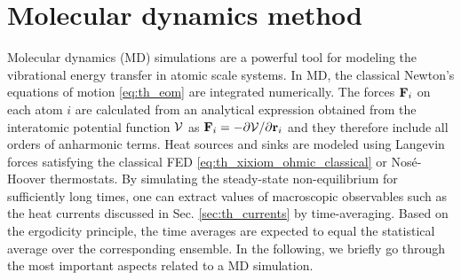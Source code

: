 



\section{Molecular dynamics method}

\label{sec:methods_md}


Molecular dynamics (MD) simulations are a powerful tool for modeling the vibrational energy transfer in atomic scale systems. In MD, the classical Newton's equations of motion \eqref{eq:th_eom} are integrated numerically. The forces $\mathbf{F}_i$ on each atom $i$ are calculated from an analytical expression obtained from the interatomic potential function $\mathcal{V}$ as $\mathbf{F}_i=-\partial \mathcal{V}/\partial \mathbf{r}_i$ and they therefore include all orders of anharmonic terms. Heat sources and sinks are modeled using Langevin forces satisfying the classical FED \eqref{eq:th_xixiom_ohmic_classical} or Nos\'e-Hoover \cite{nose84} thermostats. By simulating the steady-state non-equilibrium for sufficiently long times, one can extract values of macroscopic observables such as the heat currents discussed in Sec. \ref{sec:th_currents} by time-averaging. Based on the ergodicity principle, the time averages are expected to equal the statistical average over the corresponding ensemble. In the following, we briefly go through the most important aspects related to a MD simulation.

